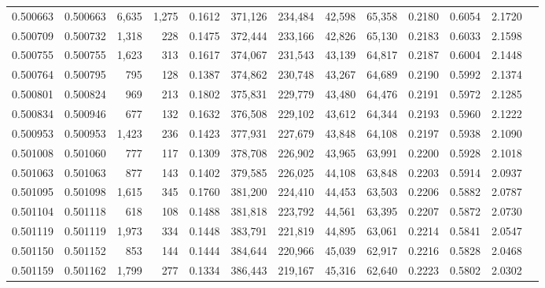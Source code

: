 \begin{tabular}{rrrrrrrrrrrrr}
0.500663 & 0.500663 & 6,635 & 1,275 &                                     0.1612 & 371,126 & 234,484 &  42,598 &  65,358 & 0.2180 & 0.6054 & 2.1720 \\
0.500709 & 0.500732 & 1,318 &   228 &                                     0.1475 & 372,444 & 233,166 &  42,826 &  65,130 & 0.2183 & 0.6033 & 2.1598 \\
0.500755 & 0.500755 & 1,623 &   313 &                                     0.1617 & 374,067 & 231,543 &  43,139 &  64,817 & 0.2187 & 0.6004 & 2.1448 \\
0.500764 & 0.500795 &   795 &   128 &                                     0.1387 & 374,862 & 230,748 &  43,267 &  64,689 & 0.2190 & 0.5992 & 2.1374 \\
0.500801 & 0.500824 &   969 &   213 &                                     0.1802 & 375,831 & 229,779 &  43,480 &  64,476 & 0.2191 & 0.5972 & 2.1285 \\
0.500834 & 0.500946 &   677 &   132 &                                     0.1632 & 376,508 & 229,102 &  43,612 &  64,344 & 0.2193 & 0.5960 & 2.1222 \\
0.500953 & 0.500953 & 1,423 &   236 &                                     0.1423 & 377,931 & 227,679 &  43,848 &  64,108 & 0.2197 & 0.5938 & 2.1090 \\
0.501008 & 0.501060 &   777 &   117 &                                     0.1309 & 378,708 & 226,902 &  43,965 &  63,991 & 0.2200 & 0.5928 & 2.1018 \\
0.501063 & 0.501063 &   877 &   143 &                                     0.1402 & 379,585 & 226,025 &  44,108 &  63,848 & 0.2203 & 0.5914 & 2.0937 \\
0.501095 & 0.501098 & 1,615 &   345 &                                     0.1760 & 381,200 & 224,410 &  44,453 &  63,503 & 0.2206 & 0.5882 & 2.0787 \\
0.501104 & 0.501118 &   618 &   108 &                                     0.1488 & 381,818 & 223,792 &  44,561 &  63,395 & 0.2207 & 0.5872 & 2.0730 \\
0.501119 & 0.501119 & 1,973 &   334 &                                     0.1448 & 383,791 & 221,819 &  44,895 &  63,061 & 0.2214 & 0.5841 & 2.0547 \\
0.501150 & 0.501152 &   853 &   144 &                                     0.1444 & 384,644 & 220,966 &  45,039 &  62,917 & 0.2216 & 0.5828 & 2.0468 \\
0.501159 & 0.501162 & 1,799 &   277 &                                     0.1334 & 386,443 & 219,167 &  45,316 &  62,640 & 0.2223 & 0.5802 & 2.0302 \\

\end{tabular}
